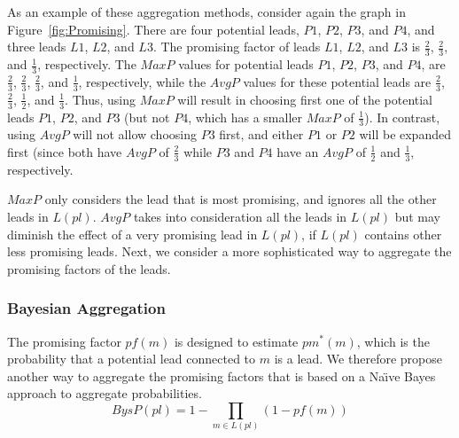 \documentclass[journal]{IEEEtran}
\newcommand{\pf}{{\textit pf}}
\begin{document}
As an example of these aggregation methods, consider again the graph in Figure~\ref{fig:Promising}. 
There are four potential leads, $P1$, $P2$, $P3$, and $P4$, and three leads $L1$, $L2$, and $L3$. 
The promising factor of leads $L1$, $L2$, and $L3$ is $\frac{2}{3}$, $\frac{2}{3}$, and 
$\frac{1}{3}$, respectively. 
The $MaxP$ values for potential leads $P1$, $P2$, $P3$, and $P4$, are $\frac{2}{3}$, $\frac{2}{3}$, $\frac{2}{3}$, and $\frac{1}{3}$, respectively, while the $AvgP$ values for these potential leads are $\frac{2}{3}$, $\frac{2}{3}$, $\frac{1}{2}$, and $\frac{1}{3}$. Thus, using $MaxP$ will result in choosing first one of the potential leads $P1$, $P2$, and $P3$ (but not $P4$, which has a smaller $MaxP$ of $\frac{1}{3}$). In contrast, using $AvgP$ will not allow choosing $P3$ first, and either $P1$ or $P2$ will be expanded first (since both have $AvgP$ of $\frac{2}{3}$ while $P3$ and $P4$ have an $AvgP$ of $\frac{1}{2}$ and $\frac{1}{3}$, respectively. 






$MaxP$ only considers the lead that is most promising, and ignores all the other leads in $L(pl)$. $AvgP$ takes into consideration all the leads in $L(pl)$ but may diminish the effect of a very promising lead in $L(pl)$, if $L(pl)$ contains other less promising leads. Next, we consider a more sophisticated way to aggregate the promising factors of the leads.




\subsubsection{Bayesian Aggregation}
The promising factor $pf(m)$ is designed to estimate $pm^*(m)$, which is the probability that a potential lead connected to $m$ is a lead. 
We therefore propose another way to aggregate the promising factors that is based on a Na\"{\i}ve Bayes approach to aggregate probabilities.
\begin{equation}
\displaystyle BysP(pl)=1-\prod_{m\in L(pl)}(1-pf(m)) 
\end{equation}
\end{document}
